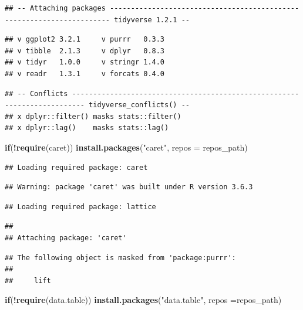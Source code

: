 \documentclass[]{article}
\newenvironment{Shaded}{\begin{snugshade}}{\end{snugshade}}
\newcommand{\ControlFlowTok}[1]{\textcolor[rgb]{0.13,0.29,0.53}{\textbf{#1}}}
\newcommand{\DataTypeTok}[1]{\textcolor[rgb]{0.13,0.29,0.53}{#1}}
\newcommand{\KeywordTok}[1]{\textcolor[rgb]{0.13,0.29,0.53}{\textbf{#1}}}
\newcommand{\NormalTok}[1]{#1}
\newcommand{\OperatorTok}[1]{\textcolor[rgb]{0.81,0.36,0.00}{\textbf{#1}}}
\newcommand{\StringTok}[1]{\textcolor[rgb]{0.31,0.60,0.02}{#1}}
\begin{document}
\begin{verbatim}
## -- Attaching packages ---------------------------------------------------------------------- tidyverse 1.2.1 --
\end{verbatim}

\begin{verbatim}
## v ggplot2 3.2.1     v purrr   0.3.3
## v tibble  2.1.3     v dplyr   0.8.3
## v tidyr   1.0.0     v stringr 1.4.0
## v readr   1.3.1     v forcats 0.4.0
\end{verbatim}

\begin{verbatim}
## -- Conflicts ------------------------------------------------------------------------- tidyverse_conflicts() --
## x dplyr::filter() masks stats::filter()
## x dplyr::lag()    masks stats::lag()
\end{verbatim}

\begin{Shaded}
\begin{Highlighting}[]
\ControlFlowTok{if}\NormalTok{(}\OperatorTok{!}\KeywordTok{require}\NormalTok{(caret)) }\KeywordTok{install.packages}\NormalTok{(}\StringTok{"caret"}\NormalTok{, }\DataTypeTok{repos =}\NormalTok{ repos_path)}
\end{Highlighting}
\end{Shaded}

\begin{verbatim}
## Loading required package: caret
\end{verbatim}

\begin{verbatim}
## Warning: package 'caret' was built under R version 3.6.3
\end{verbatim}

\begin{verbatim}
## Loading required package: lattice
\end{verbatim}

\begin{verbatim}
## 
## Attaching package: 'caret'
\end{verbatim}

\begin{verbatim}
## The following object is masked from 'package:purrr':
## 
##     lift
\end{verbatim}

\begin{Shaded}
\begin{Highlighting}[]
\ControlFlowTok{if}\NormalTok{(}\OperatorTok{!}\KeywordTok{require}\NormalTok{(data.table)) }\KeywordTok{install.packages}\NormalTok{(}\StringTok{"data.table"}\NormalTok{, }\DataTypeTok{repos =}\NormalTok{repos_path)}
\end{Highlighting}
\end{Shaded}
\end{document}
